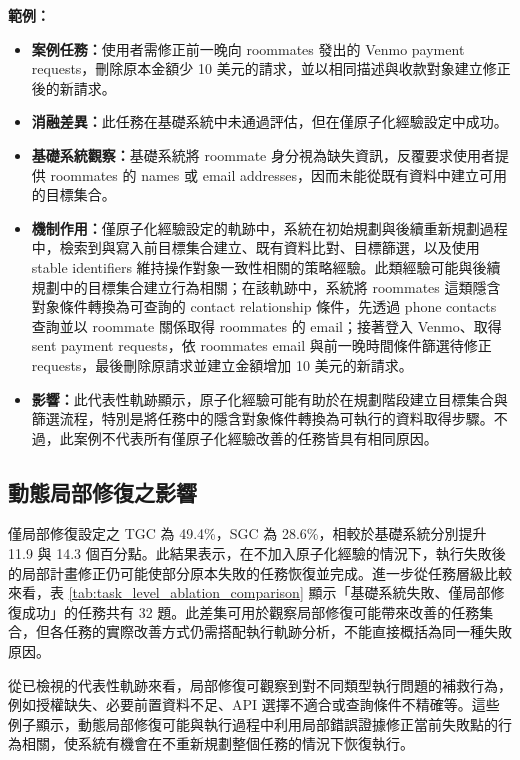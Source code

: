 \begin{ZhChapter}
\noindent\textbf{範例：}
\begin{itemize}
    \item \textbf{案例任務：}使用者需修正前一晚向 roommates 發出的 Venmo payment requests，刪除原本金額少 10 美元的請求，並以相同描述與收款對象建立修正後的新請求。
    \item \textbf{消融差異：}此任務在基礎系統中未通過評估，但在僅原子化經驗設定中成功。
    \item \textbf{基礎系統觀察：}基礎系統將 roommate 身分視為缺失資訊，反覆要求使用者提供 roommates 的 names 或 email addresses，因而未能從既有資料中建立可用的目標集合。
    \item \textbf{機制作用：}僅原子化經驗設定的軌跡中，系統在初始規劃與後續重新規劃過程中，檢索到與寫入前目標集合建立、既有資料比對、目標篩選，以及使用 stable identifiers 維持操作對象一致性相關的策略經驗。此類經驗可能與後續規劃中的目標集合建立行為相關；在該軌跡中，系統將 roommates 這類隱含對象條件轉換為可查詢的 contact relationship 條件，先透過 phone contacts 查詢並以 roommate 關係取得 roommates 的 email；接著登入 Venmo、取得 sent payment requests，依 roommates email 與前一晚時間條件篩選待修正 requests，最後刪除原請求並建立金額增加 10 美元的新請求。
    \item \textbf{影響：}此代表性軌跡顯示，原子化經驗可能有助於在規劃階段建立目標集合與篩選流程，特別是將任務中的隱含對象條件轉換為可執行的資料取得步驟。不過，此案例不代表所有僅原子化經驗改善的任務皆具有相同原因。
\end{itemize}
\subsection*{動態局部修復之影響}

僅局部修復設定之 TGC 為 49.4\%，SGC 為 28.6\%，相較於基礎系統分別提升 11.9 與 14.3 個百分點。此結果表示，在不加入原子化經驗的情況下，執行失敗後的局部計畫修正仍可能使部分原本失敗的任務恢復並完成。進一步從任務層級比較來看，表 \ref{tab:task_level_ablation_comparison} 顯示「基礎系統失敗、僅局部修復成功」的任務共有 32 題。此差集可用於觀察局部修復可能帶來改善的任務集合，但各任務的實際改善方式仍需搭配執行軌跡分析，不能直接概括為同一種失敗原因。

從已檢視的代表性軌跡來看，局部修復可觀察到對不同類型執行問題的補救行為，例如授權缺失、必要前置資料不足、API 選擇不適合或查詢條件不精確等。這些例子顯示，動態局部修復可能與執行過程中利用局部錯誤證據修正當前失敗點的行為相關，使系統有機會在不重新規劃整個任務的情況下恢復執行。


\end{ZhChapter}
